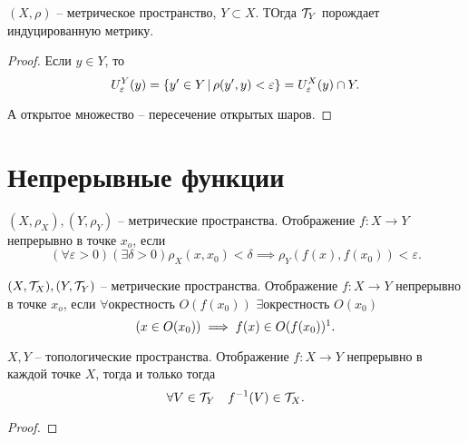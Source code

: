 \begin{theorem}
    $(X, \rho)$ -- метрическое пространство, $Y \subset X$. ТОгда $\mathcal T_Y$ порождает индуцированную метрику.
\end{theorem}
\begin{proof}
    Если $y\in Y$, то \[
    U_\varepsilon^Y(y) = \{y'\in Y\,|\, \rho(y', y) < \varepsilon\} = U_\varepsilon^X(y)\cap Y.
    \]
    
    А открытое множество -- пересечение открытых шаров.
\end{proof}

\section{Непрерывные функции}
\begin{definition}
    $(X, \rho_X), (Y, \rho_Y)$ -- метрические пространства. Отображение $f\colon X \to Y$ непрерывно в точке $x_o$, если \[
    (\forall \varepsilon > 0)(\exists \delta > 0) \rho_X(x,x_0) < \delta \implies \rho_Y(f(x), f(x_0)) < \varepsilon.
    \]
\end{definition}

\begin{definition}
    $(X, \mathcal T_X), (Y, \mathcal T_Y)$ -- метрические пространства. Отображение $f\colon X \to Y$ непрерывно в точке $x_o$, если \(
        \forall \text{окрестность }O(f(x_0))\) \(\exists \text{окрестность }O(x_0)
    \)
    \[
    (x\in O(x_0)) \implies f(x) \in O(f(x_0))\footnotemark.
    \]
\end{definition}

\begin{theorem}
    $X, Y$ -- топологические пространства. Отображение $f\colon X \to Y$ непрерывно в каждой точке $X$, тогда и только тогда \[
    \forall V \in \mathcal T_Y\quad f^{-1}(V) \in \mathcal T_X.
    \]
\end{theorem}
\begin{proof}
\end{proof}

